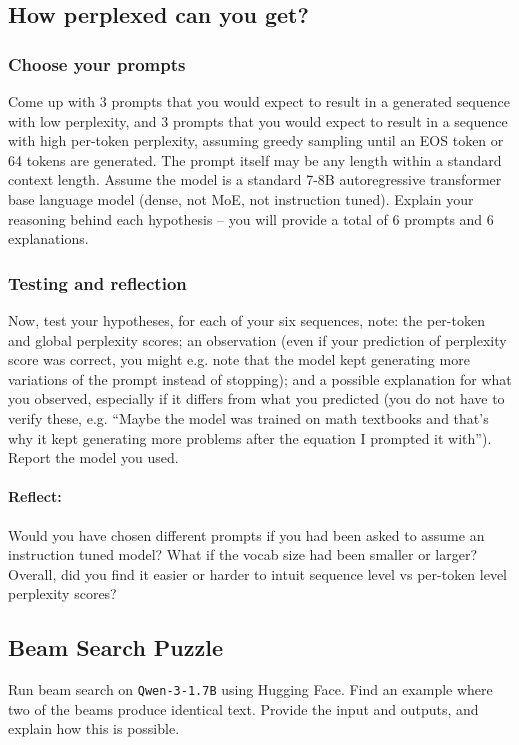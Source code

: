 \documentclass{article}
\begin{document}
\begin{solve}

\end{solve}

\subsection{How perplexed can you get?}

\subsubsection{Choose your prompts}
Come up with 3 prompts that you would expect to result in a generated sequence with low perplexity, and 3 prompts that you would expect to result in a sequence with high per-token perplexity, assuming greedy sampling until an EOS token or 64 tokens are generated. The prompt itself may be any length within a standard context length. Assume the model is a standard 7-8B autoregressive transformer base language model (dense, not MoE, not instruction tuned). Explain your reasoning behind each hypothesis -- you will provide a total of 6 prompts and 6 explanations. 

\subsubsection{Testing and reflection}
Now, test your hypotheses, for each of your six sequences, note: the per-token and global perplexity scores; an observation (even if your prediction of perplexity score was correct, you might e.g. note that the model kept generating more variations of the prompt instead of stopping); and a possible explanation for what you observed, especially if it differs from what you predicted (you do not have to verify these, e.g. ``Maybe the model was trained on math textbooks and that's why it kept generating more problems after the equation I prompted it with''). Report the model you used.

\paragraph{Reflect: } Would you have chosen different prompts if you had been asked to assume an instruction tuned model? What if the vocab size had been smaller or larger? Overall, did you find it easier or harder to intuit sequence level vs per-token level perplexity scores?


\subsection{Beam Search Puzzle}
Run beam search on \texttt{Qwen-3-1.7B} using Hugging Face. Find an example where two of the beams produce identical text. Provide the input and outputs, and explain how this is possible. 
\end{document}
